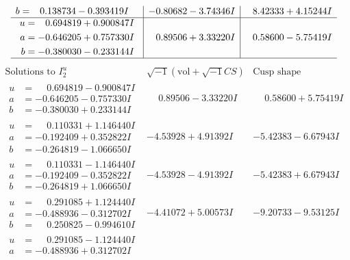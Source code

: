 \documentclass[1p]{elsarticle_modified}
\theoremstyle{definition}
\newcommand{\I}{\sqrt{-1}}
\begin{document}
$$\begin{array}{c|c|c}
\begin{aligned}
b &= \phantom{-}0.138734 - 0.393419 I\end{aligned}
 & -0.80682 - 3.74346 I & \phantom{-}8.42333 + 4.15244 I \\ \hline\begin{aligned}
u &= \phantom{-}0.694819 + 0.900847 I \\
a &= -0.646205 + 0.757330 I \\
b &= -0.380030 - 0.233144 I\end{aligned}
 & \phantom{-}0.89506 + 3.33220 I & \phantom{-}0.58600 - 5.75419 I\\
 \hline 
 \end{array}$$\newpage$$\begin{array}{c|c|c}  
\text{Solutions to }I^u_{2}& \I (\text{vol} + \sqrt{-1}CS) & \text{Cusp shape}\\
 \hline 
\begin{aligned}
u &= \phantom{-}0.694819 - 0.900847 I \\
a &= -0.646205 - 0.757330 I \\
b &= -0.380030 + 0.233144 I\end{aligned}
 & \phantom{-}0.89506 - 3.33220 I & \phantom{-}0.58600 + 5.75419 I \\ \hline\begin{aligned}
u &= \phantom{-}0.110331 + 1.146440 I \\
a &= -0.192409 + 0.352822 I \\
b &= -0.264819 - 1.066650 I\end{aligned}
 & -4.53928 + 4.91392 I & -5.42383 - 6.67943 I \\ \hline\begin{aligned}
u &= \phantom{-}0.110331 - 1.146440 I \\
a &= -0.192409 - 0.352822 I \\
b &= -0.264819 + 1.066650 I\end{aligned}
 & -4.53928 - 4.91392 I & -5.42383 + 6.67943 I \\ \hline\begin{aligned}
u &= \phantom{-}0.291085 + 1.124440 I \\
a &= -0.488936 - 0.312702 I \\
b &= \phantom{-}0.250825 - 0.994610 I\end{aligned}
 & -4.41072 + 5.00573 I & -9.20733 - 9.53125 I \\ \hline\begin{aligned}
u &= \phantom{-}0.291085 - 1.124440 I \\
a &= -0.488936 + 0.312702 I \\

\end{aligned}
\end{array}$$
\end{document}
